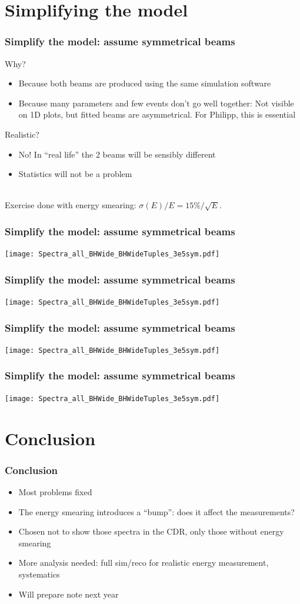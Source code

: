 \documentclass{beamer}
\begin{document}
\section{Simplifying the model}
\begin{frame}
\frametitle{Simplify the model: assume symmetrical beams}
Why?
\begin{itemize}
  \item Because both beams are produced using the same simulation software
  \item Because many parameters and few events don't go well together: Not
  visible on 1D plots, but fitted beams are asymmetrical. For Philipp, this is
  essential
\end{itemize}
Realistic?
\begin{itemize}
  \item No! In ``real life'' the 2 beams will be sensibly different
  \item Statistics will not be a problem 
\end{itemize}
~\\
Exercise done with energy smearing: $\sigma(E)/E = 15\%/\sqrt{E}$.
\end{frame}
\begin{frame}
\frametitle{Simplify the model: assume symmetrical beams}
\texttt{[image: Spectra\_all\_BHWide\_BHWideTuples\_3e5sym.pdf]}
\end{frame}
\begin{frame}
\frametitle{Simplify the model: assume symmetrical beams}
\texttt{[image: Spectra\_all\_BHWide\_BHWideTuples\_3e5sym.pdf]}
\end{frame}
\begin{frame}
\frametitle{Simplify the model: assume symmetrical beams}
\texttt{[image: Spectra\_all\_BHWide\_BHWideTuples\_3e5sym.pdf]}
\end{frame}
\begin{frame}
\frametitle{Simplify the model: assume symmetrical beams}
\texttt{[image: Spectra\_all\_BHWide\_BHWideTuples\_3e5sym.pdf]}
\end{frame}

\section{Conclusion}
\begin{frame}
\frametitle{Conclusion}
\begin{itemize}
  \item Most problems fixed
  \item The energy smearing introduces a ``bump'': does it affect the
  measurements?
  \item Chosen not to show those spectra in the CDR, only those without energy
  smearing
  \item More analysis needed: full sim/reco for realistic energy measurement,
  systematics
  \item Will prepare note next year
\end{itemize}
\end{frame}
\end{document}
